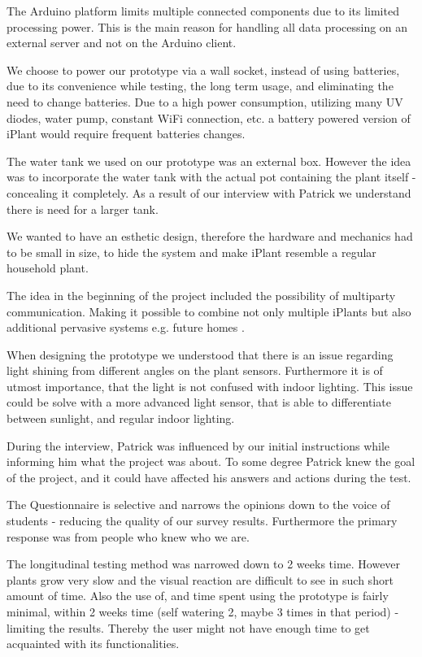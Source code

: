\documentclass{ubicomp2012}
\begin{document}
The Arduino platform limits multiple connected components due to its limited processing power. This is the main reason for handling all data processing on an external server and not on the Arduino client.

We choose to power our prototype via a wall socket, instead of using batteries, due to its convenience while testing, the long term usage, and eliminating the need to change batteries.
Due to a high power consumption, utilizing many UV diodes, water pump, constant WiFi connection, etc. a battery powered version of iPlant would require frequent batteries changes.

The water tank we used on our prototype was an external box. However the idea was to incorporate the water tank with the actual pot containing the plant itself - concealing it completely. As a result of our interview with Patrick we understand there is need for a larger tank.

We wanted to have an esthetic design, therefore the hardware and mechanics had to be small in size, to hide the system and make iPlant resemble a regular household plant.

The idea in the beginning of the project included the possibility of multiparty communication. Making it possible to combine not only multiple iPlants but also additional pervasive systems e.g. future homes \cite{future-homes}.

When designing the prototype we understood that there is an issue regarding light shining from different angles on the plant sensors. Furthermore it is of utmost importance, that the light is not confused with indoor lighting. This issue could be solve with a more advanced light sensor, that is able to differentiate between sunlight, and regular indoor lighting.

During the interview, Patrick was influenced by our initial instructions while informing him what the project was about. To some degree Patrick knew the goal of the project, and it could have affected his answers and actions during the test.

The Questionnaire is selective and narrows the opinions down to the voice of students - reducing the quality of our survey results. Furthermore the primary response was from people who knew who we are.

The longitudinal testing method was narrowed down to 2 weeks time. However plants grow very slow and the visual reaction are difficult to see in such short amount of time. Also the use of, and time spent using the prototype is fairly minimal, within 2 weeks time (self watering 2, maybe 3 times in that period) - limiting the results. Thereby the user might not have enough time to get acquainted with its functionalities.
\end{document}
